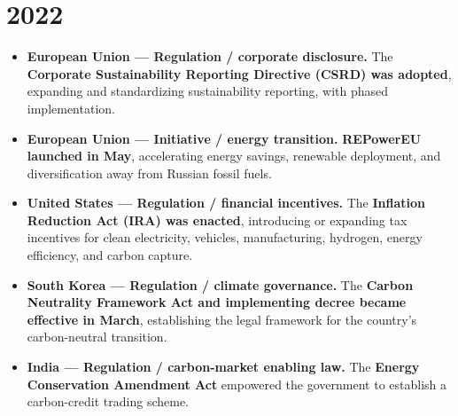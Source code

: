 \documentclass[11pt,a4paper]{article}
\newcommand{\entry}[3]{\item \textbf{#1 --- #2.} #3}
\begin{document}
\section*{2022}
\begin{itemize}
\entry{European Union}{Regulation / corporate disclosure}{The \textbf{Corporate Sustainability Reporting Directive (CSRD) was adopted}, expanding and standardizing sustainability reporting, with phased implementation.\cite{csrd}}
\entry{European Union}{Initiative / energy transition}{\textbf{REPowerEU launched in May}, accelerating energy savings, renewable deployment, and diversification away from Russian fossil fuels.\cite{repower}}
\entry{United States}{Regulation / financial incentives}{The \textbf{Inflation Reduction Act (IRA) was enacted}, introducing or expanding tax incentives for clean electricity, vehicles, manufacturing, hydrogen, energy efficiency, and carbon capture.\cite{ira}}
\entry{South Korea}{Regulation / climate governance}{The \textbf{Carbon Neutrality Framework Act and implementing decree became effective in March}, establishing the legal framework for the country's carbon-neutral transition.\cite{korea}}
\entry{India}{Regulation / carbon-market enabling law}{The \textbf{Energy Conservation Amendment Act} empowered the government to establish a carbon-credit trading scheme.\cite{indiaccts}}
\end{itemize}
\end{document}
